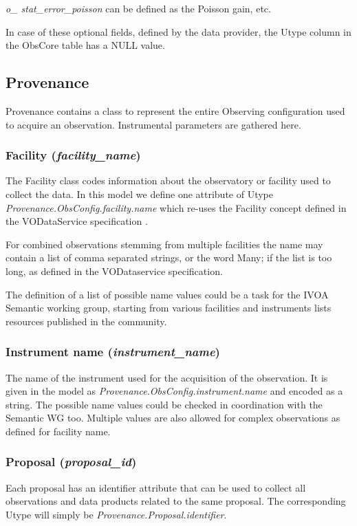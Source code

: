 \documentclass[11pt,a4paper]{ivoa}
\begin{document}
\emph{o\_ stat\_error\_poisson} can be defined as the Poisson gain, etc.

In case of these optional fields, defined by the data provider, the Utype column in the ObsCore table has a NULL value.

\subsection{Provenance}
\label{bkm:Ref482804135}Provenance contains a class to represent the entire Observing configuration used to acquire an
observation.  Instrumental parameters are gathered here.

\subsubsection{Facility (\emph{facility\_name})}
The Facility class codes information about the observatory or facility used to collect the data. In this model we define
one attribute of Utype \emph{Provenance.ObsConfig.facility.name} which re-uses the Facility concept defined in the
VODataService specification \citep{2010ivoa.spec.1202P}.

For combined observations stemming from multiple facilities the name may contain a list of comma separated strings, or
the word {\textquotedbl}Many{\textquotedbl}; if the list is too long, as defined in the VODataservice specification.

The definition of a list of possible name values could be a task for the IVOA Semantic working group, starting from
various facilities and instruments lists resources published in the community.

\subsubsection{Instrument name (\emph{instrument\_name})}
The name of the instrument used for the acquisition of the observation.  It is given in the model as
\emph{Provenance.ObsConfig.instrument.name} and encoded as a string. The possible name values could be checked in coordination
with the Semantic WG too. Multiple values are also allowed for complex observations as defined for facility name.

\subsubsection{Proposal (\emph{proposal\_id})}
Each proposal has an identifier attribute that can be used to collect all observations and data products related to the
same proposal. The corresponding Utype will simply be \emph{Provenance.Proposal.identifier}.
\end{document}
